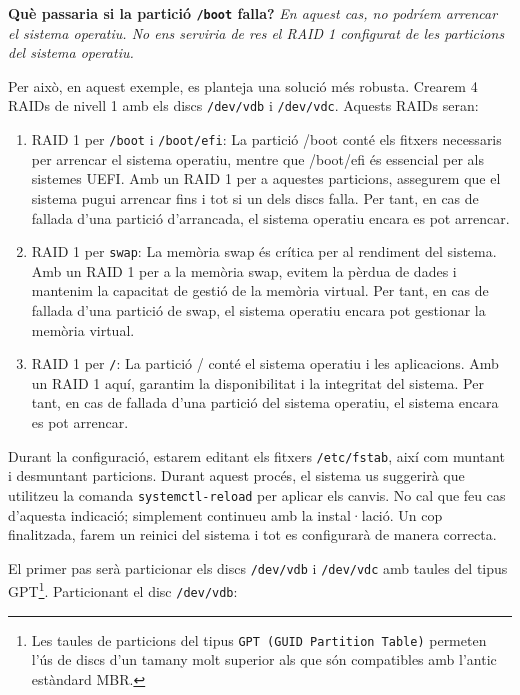\begin{mdframed}[linewidth=2pt,linecolor=teal]
\textbf{Què passaria si la partició \texttt{/boot} falla?} \textit{En aquest cas, no podríem arrencar el sistema operatiu. No ens serviria de res el RAID 1 configurat de les particions del sistema operatiu.}
\end{mdframed}


Per això, en aquest exemple, es planteja una solució més robusta. Crearem 4 RAIDs de nivell 1 amb els discs \texttt{/dev/vdb} i \texttt{/dev/vdc}. Aquests RAIDs seran:

\begin{enumerate}
        \item RAID 1 per \texttt{/boot} i \texttt{/boot/efi}:  La partició /boot conté els fitxers necessaris per arrencar el sistema operatiu, mentre que /boot/efi és essencial per als sistemes UEFI. Amb un RAID 1 per a aquestes particions, assegurem que el sistema pugui arrencar fins i tot si un dels discs falla. Per tant, en cas de fallada d'una partició d'arrancada, el sistema operatiu encara es pot arrencar.
        \item RAID 1 per \texttt{swap}: La memòria swap és crítica per al rendiment del sistema. Amb un RAID 1 per a la memòria swap, evitem la pèrdua de dades i mantenim la capacitat de gestió de la memòria virtual. Per tant, en cas de fallada d'una partició de swap, el sistema operatiu encara pot gestionar la memòria virtual.
        \item RAID 1 per \texttt{/}: La partició / conté el sistema operatiu i les aplicacions. Amb un RAID 1 aquí, garantim la disponibilitat i la integritat del sistema. Per tant, en cas de fallada d'una partició del sistema operatiu, el sistema encara es pot arrencar.
\end{enumerate}

\begin{warning}
Durant la configuració, estarem editant els fitxers \texttt{/etc/fstab}, així com muntant i desmuntant particions. Durant aquest procés, el sistema us suggerirà que utilitzeu la comanda \texttt{systemctl-reload} per aplicar els canvis. No cal que feu cas d’aquesta indicació; simplement continueu amb la instal·lació. Un cop finalitzada, farem un reinici del sistema i tot es configurarà de manera correcta.
\end{warning}

El primer pas serà particionar els discs \texttt{/dev/vdb} i \texttt{/dev/vdc} amb taules del tipus GPT\footnote{Les taules de particions del tipus  \texttt{GPT (GUID Partition Table)} permeten l'ús de discs d'un tamany molt superior als que són compatibles amb l'antic estàndard MBR.}. Particionant el disc  \texttt{/dev/vdb}:

